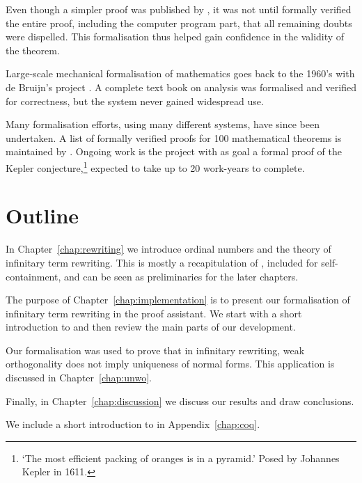 Even though a simpler proof was published by \citet{robertson-97}, it
was not until \citet{gonthier-05} formally verified the entire proof,
including the computer program part, that all remaining doubts were
dispelled. This formalisation thus helped gain confidence in the
validity of the theorem.

Large-scale mechanical formalisation of mathematics goes back to the %
1960's with de Bruijn's \Automath project
\citep{nederpelt-94}. A complete text book on analysis
\citep{landau-65} was formalised and verified for correctness, but the
system never gained widespread use.

Many formalisation efforts, using many different systems, have since
been undertaken. A list of formally verified proofs for 100
mathematical theorems is maintained by \citet{wiedijk-08}. Ongoing
work is the \Flyspeck project \citep{hales-09} with as goal a formal
proof of the Kepler conjecture,\footnote{`The most efficient packing
  of oranges is in a pyramid.' Posed by Johannes Kepler in 1611.}
expected to take up to 20 work-years to complete.


\section*{Outline}

In Chapter~\ref{chap:rewriting} we introduce ordinal numbers and the
theory of infinitary term rewriting. This is mostly a recapitulation
of \citet{terese-03}, included for self-containment, and can be seen
as preliminaries for the later chapters.

The purpose of Chapter~\ref{chap:implementation} is to present our
formalisation of infinitary term rewriting in the \Coq proof
assistant. We start with a short introduction to \Coq and then review
the main parts of our development.

Our formalisation was used to prove that in infinitary rewriting, weak
orthogonality does not imply uniqueness of normal forms. This
application is discussed in Chapter~\ref{chap:unwo}.

Finally, in Chapter~\ref{chap:discussion} we discuss our results and
draw conclusions.

We include a short introduction to \Coq in Appendix~\ref{chap:coq}.
